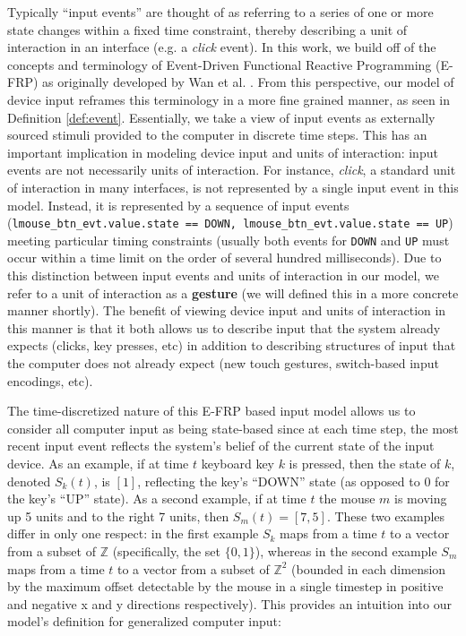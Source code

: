 \documentclass{article}
\newcommand{\Z}{\mathbb{Z}}
\begin{document}
Typically ``input events'' are thought of as referring to a series of one or more state changes within a fixed time constraint, thereby describing a unit of interaction in an interface (e.g. a \textit{click} event).
In this work, we build off of the concepts and terminology of Event-Driven Functional Reactive Programming (E-FRP) as originally developed by Wan et al. \cite{wan2002event}. From this perspective, our model of device input reframes this terminology in a more fine grained manner, as seen in Definition \ref{def:event}. Essentially, we take a view of input events as externally sourced stimuli provided to the computer in discrete time steps. This has an important implication in modeling device input and units of interaction: input events are not necessarily units of interaction. For instance, \textit{click}, a standard unit of interaction in many interfaces, is not represented by a single input event in this model. Instead, it is represented by a sequence of input events (\texttt{lmouse\_btn\_evt.value.state == DOWN, lmouse\_btn\_evt.value.state == UP}) meeting particular timing constraints (usually both events for \texttt{DOWN} and \texttt{UP} must occur within a time limit on the order of several hundred milliseconds). Due to this distinction between input events and units of interaction in our model, we refer to a unit of interaction as a \textbf{gesture} (we will defined this in a more concrete manner shortly). The benefit of viewing device input and units of interaction in this manner is that it both allows us to describe input that the system already expects (clicks, key presses, etc) in addition to describing structures of input that the computer does not already expect (new touch gestures, switch-based input encodings, etc).

The time-discretized nature of this E-FRP based input model allows us to consider all computer input as being state-based since at each time step, the most recent input event reflects the system's belief of the current state of the input device.
As an example, if at time $t$ keyboard key $k$ is pressed, then the state of $k$, denoted $S_k(t)$, is $[1]$, reflecting the key's ``DOWN'' state (as opposed to $0$ for the key's ``UP'' state). As a second example, if at time $t$ the mouse $m$ is moving up 5 units and to the right 7 units, then $S_m(t) = [7, 5]$. These two examples differ in only one respect: in the first example $S_k$ maps from a time $t$ to a vector from a subset of $\Z$ (specifically, the set $\{0, 1\}$), whereas in the second example $S_m$ maps from a time $t$ to a vector from a subset of $\Z^2$ (bounded in each dimension by the maximum offset detectable by the mouse in a single timestep in positive and negative x and y directions respectively). This provides an intuition into our model's definition for generalized computer input:
\end{document}

